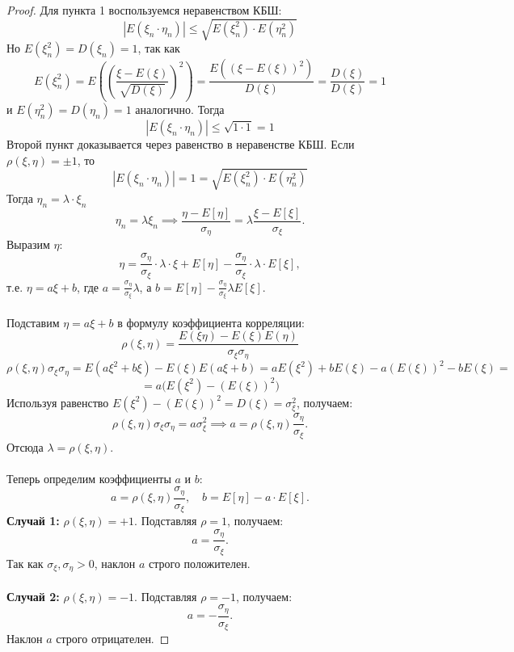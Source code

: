 \documentclass[11pt]{article}
\begin{document}
\begin{proof}
    Для пункта 1 воспользуемся неравенством КБШ:
    \[\left\lvert E(\xi_n \cdot \eta_n) \right\rvert \leq \sqrt{E(\xi_n^2) \cdot E(\eta_n^2)}\]
    Но $E(\xi_n^2) = D(\xi_n) = 1$, так как
    \[E(\xi_n^2) = E\left(\left(\frac{\xi - E(\xi)}{\sqrt{D(\xi)}}\right)^2\right) = \frac{E((\xi - E(\xi))^2)}{D(\xi)} = \frac{D(\xi)}{D(\xi)} = 1\]
    и $E(\eta_n^2) = D(\eta_n) = 1$ аналогично. Тогда
    \[\left\lvert E(\xi_n \cdot \eta_n) \right\rvert \leq \sqrt{1 \cdot 1} = 1\]
    Второй пункт доказывается через равенство в неравенстве КБШ. Если $\rho(\xi, \eta) = \pm 1$, то
    \[\left\lvert E(\xi_n \cdot \eta_n) \right\rvert = 1 = \sqrt{E(\xi_n^2) \cdot E(\eta_n^2)}\]
    Тогда $\eta_n = \lambda \cdot \xi_n$
    \[
    \eta_n = \lambda \xi_n \implies \frac{\eta - E[\eta]}{\sigma_\eta} = \lambda \frac{\xi - E[\xi]}{\sigma_\xi}.
    \]
    Выразим \(\eta\):
    \[
    \eta = \frac{\sigma_\eta}{\sigma_\xi} \cdot \lambda \cdot \xi + E[\eta] - \frac{\sigma_\eta}{\sigma_\xi} \cdot \lambda \cdot E[\xi],
    \]
    т.е. \(\eta = a\xi + b\), где \(a = \displaystyle \frac{\sigma_\eta}{\sigma_\xi} \lambda\), а \(b = E[\eta] - \displaystyle \frac{\sigma_\eta}{\sigma_\xi} \lambda E[\xi]\). \\ \\
    Подставим \(\eta = a\xi + b\) в формулу коэффициента корреляции:
    \[\rho(\xi, \eta) = \frac{E(\xi\eta) - E(\xi)E(\eta)}{\sigma_\xi \sigma_\eta}\]
    \[\rho(\xi, \eta) \sigma_\xi \sigma_\eta = E(a\xi^2 + b\xi) - E(\xi)E(a\xi + b) = aE(\xi^2) + bE(\xi) - a(E(\xi))^{2} - bE(\xi) =\]
    \[= a \Big( E(\xi^2) - (E(\xi))^{2} \Big)\]
    Используя равенство \(E(\xi^2) - (E(\xi))^{2} = D(\xi) = \sigma_\xi^2\), получаем:
    \[
    \rho(\xi, \eta) \sigma_\xi \sigma_\eta = a \sigma_\xi^2 \implies a = \rho(\xi, \eta) \frac{\sigma_\eta}{\sigma_\xi}.
    \]
    Отсюда \(\lambda = \rho(\xi, \eta)\). \\ \\
    Теперь определим коэффициенты \(a\) и \(b\):
    \[
    a = \rho(\xi, \eta) \frac{\sigma_\eta}{\sigma_\xi}, \quad b = E[\eta] - a \cdot E[\xi].
    \]
    \textbf{Случай 1:} \(\rho(\xi, \eta) = +1\). 
    Подставляя \(\rho = 1\), получаем:
    \[
    a = \frac{\sigma_\eta}{\sigma_\xi}.
    \]
    Так как \(\sigma_\xi, \sigma_\eta > 0\), наклон \(a\) строго положителен. \\ \\
    \textbf{Случай 2:} \(\rho(\xi, \eta) = -1\). 
    Подставляя \(\rho = -1\), получаем:
    \[
    a = -\frac{\sigma_\eta}{\sigma_\xi}.
    \]
    Наклон \(a\) строго отрицателен.
\end{proof}
\end{document}
